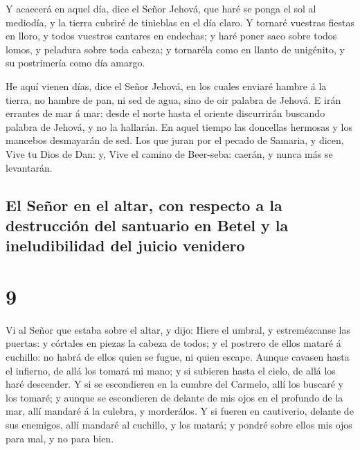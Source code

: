  Y acaecerá en aquel día, dice el Señor Jehová, que haré
se ponga el sol al mediodía, y la tierra cubriré de tinieblas en el día
claro.  Y tornaré vuestras fiestas en lloro, y todos
vuestros cantares en endechas; y haré poner saco sobre todos lomos, y
peladura sobre toda cabeza; y tornaréla como en llanto de unigénito, y
su postrimería como día amargo.

 He aquí vienen días, dice el Señor Jehová, en los cuales
enviaré hambre á la tierra, no hambre de pan, ni sed de agua, sino de
oir palabra de Jehová.  E irán errantes de mar á mar:
desde el norte hasta el oriente discurrirán buscando palabra de Jehová,
y no la hallarán.  En aquel tiempo las doncellas hermosas
y los mancebos desmayarán de sed.  Los que juran por el
pecado de Samaria, y dicen, Vive tu Dios de Dan: y, Vive el camino de
Beer-seba: caerán, y nunca más se levantarán.

\hypertarget{el-seuxf1or-en-el-altar-con-respecto-a-la-destrucciuxf3n-del-santuario-en-betel-y-la-ineludibilidad-del-juicio-venidero}{%
\subsection{El Señor en el altar, con respecto a la destrucción del
santuario en Betel y la ineludibilidad del juicio
venidero}\label{el-seuxf1or-en-el-altar-con-respecto-a-la-destrucciuxf3n-del-santuario-en-betel-y-la-ineludibilidad-del-juicio-venidero}}

\hypertarget{section-30-9}{%
\section{9}\label{section-30-9}}

 Vi al Señor que estaba sobre el altar, y dijo: Hiere el
umbral, y estremézcanse las puertas: y córtales en piezas la cabeza de
todos; y el postrero de ellos mataré á cuchillo: no habrá de ellos quien
se fugue, ni quien escape.  Aunque cavasen hasta el
infierno, de allá los tomará mi mano; y si subieren hasta el cielo, de
allá los haré descender.  Y si se escondieren en la cumbre
del Carmelo, allí los buscaré y los tomaré; y aunque se escondieren de
delante de mis ojos en el profundo de la mar, allí mandaré á la culebra,
y morderálos.  Y si fueren en cautiverio, delante de sus
enemigos, allí mandaré al cuchillo, y los matará; y pondré sobre ellos
mis ojos para mal, y no para bien.

